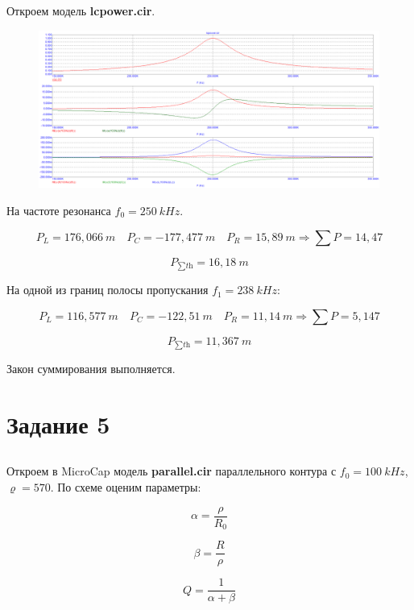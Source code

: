 \documentclass{article}
\begin{document}
\subsection{}
Откроем модель \textbf{lcpower.cir}.

\begin{figure}[H]
\centering
\includegraphics[scale=0.4]{lcpower.png}
\label{fig:Image1}
\end{figure} 

На частоте резонанса $f_0 = 250 \: kHz$.

\[P_L = 176,066 \: m \quad P_C = -177,477 \: m \quad P_R = 15,89 \: m \Rightarrow \sum P = 14,47\]

\[P_{\sum \textit{th}} = 16,18 \: m\]

На одной из границ полосы пропускания $f_1 = 238 \: kHz$:

\[P_L = 116,577 \: m \quad P_C = -122,51 \: m \quad P_R = 11,14 \: m \Rightarrow \sum P = 5,147\]

\[P_{\sum \textit{th}} = 11,367 \: m\]

Закон суммирования выполняется.

\section{Задание 5}

\subsection{}

Откроем в MicroCap модель \textbf{parallel.cir} параллельного контура с $f_0 = 100 \: kHz$, $\varrho = 570$. По схеме оценим параметры:

\[\alpha = \frac{\rho}{R_0}\]

\[\beta = \frac{R}{\rho}\]

\[Q = \frac{1}{\alpha + \beta}\]
\end{document}
